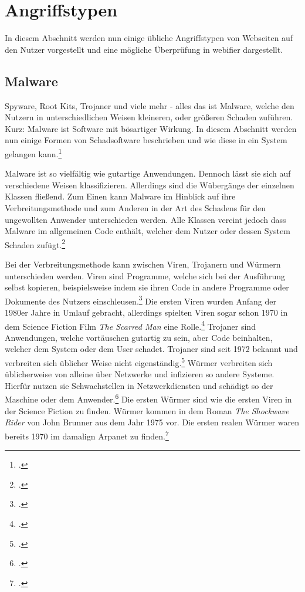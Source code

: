 \section{Angriffstypen}

In diesem Abschnitt werden nun einige übliche Angriffstypen von Webseiten auf den Nutzer vorgestellt und eine mögliche Überprüfung in webifier dargestellt.


\subsection{Malware}

Spyware, Root Kits, Trojaner und viele mehr - alles das ist Malware, welche den Nutzern in unterschiedlichen Weisen kleineren, oder größeren Schaden zuführen. Kurz: Malware ist Software mit bösartiger Wirkung. In diesem Abschnitt werden nun einige Formen von Schadsoftware beschrieben und wie diese in ein System gelangen kann.\footcite[Vgl.][95]{netzwerkDatensicherheit}

Malware ist so vielfältig wie gutartige Anwendungen. Dennoch lässt sie sich auf verschiedene Weisen klassifizieren. Allerdings sind die Wübergänge der einzelnen Klassen fließend. Zum Einen kann Malware im Hinblick auf ihre Verbreitungsmethode und zum Anderen in der Art des Schadens für den ungewollten Anwender unterschieden werden. Alle Klassen vereint jedoch dass Malware im allgemeinen Code enthält, welcher dem Nutzer oder dessen System Schaden zufügt.\footcite[Vgl.][95\psq]{netzwerkDatensicherheit}

Bei der Verbreitungsmethode kann zwischen Viren, Trojanern und Würmern unterschieden werden. Viren sind Programme, welche sich bei der Ausführung selbst kopieren, beispielsweise indem sie ihren Code in andere Programme oder Dokumente des Nutzers einschleusen.\footcite[Vgl.][95]{netzwerkDatensicherheit} Die ersten Viren wurden Anfang der 1980er Jahre in Umlauf gebracht, allerdings spielten Viren sogar schon 1970 in dem Science Fiction Film \textit{The Scarred Man} eine Rolle.\footcite[Vgl.][14]{virusesMalware} Trojaner sind Anwendungen, welche vortäuschen gutartig zu sein, aber Code beinhalten, welcher dem System oder dem User schadet. Trojaner sind seit 1972 bekannt und verbreiten sich üblicher Weise nicht eigenständig.\footcite[Vgl.][12\psq]{virusesMalware} Würmer verbreiten sich üblicherweise von alleine über Netzwerke und infizieren so andere Systeme. Hierfür nutzen sie Schwachstellen in Netzwerkdiensten und schädigt so der Maschine oder dem Anwender.\footcite[Vgl.][95]{netzwerkDatensicherheit} Die ersten Würmer sind wie die ersten Viren in der Science Fiction zu finden. Würmer kommen in dem Roman \textit{The Shockwave Rider} von John Brunner aus dem Jahr 1975 vor. Die ersten realen Würmer waren bereits 1970 im damalign Arpanet zu finden.\footcite[Vgl.][15]{virusesMalware}

